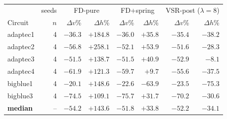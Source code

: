 \begin{tabular}{lr|rr|rr|rr}
\toprule
& seeds & \multicolumn{2}{c|}{FD-pure} & \multicolumn{2}{c|}{FD+spring} & \multicolumn{2}{c}{VSR-post ($\lambda{=}8$)} \\
Circuit & $n$ & $\Delta v$\% & $\Delta h$\% & $\Delta v$\% & $\Delta h$\% & $\Delta v$\% & $\Delta h$\% \\
\midrule
adaptec1 & 4 & $-36.3$ & $+184.8$ & $-36.0$ & $+35.8$ & $-35.4$ & $-38.2$ \\
adaptec2 & 4 & $-56.8$ & $+258.1$ & $-52.1$ & $+53.9$ & $-51.6$ & $-28.3$ \\
adaptec3 & 4 & $-51.5$ & $+138.7$ & $-51.5$ & $+40.9$ & $-52.9$ & $-8.1$ \\
adaptec4 & 4 & $-61.9$ & $+121.3$ & $-59.7$ & $+9.7$ & $-55.6$ & $-37.5$ \\
bigblue1 & 4 & $-20.1$ & $+148.6$ & $-22.6$ & $-63.9$ & $-23.5$ & $-75.3$ \\
bigblue3 & 4 & $-74.5$ & $+109.1$ & $-75.7$ & $+31.7$ & $-70.2$ & $-30.6$ \\
\midrule
\textbf{median} & -- & $-54.2$ & $+143.6$ & $-51.8$ & $+33.8$ & $-52.2$ & $-34.1$ \\
\bottomrule
\end{tabular}
